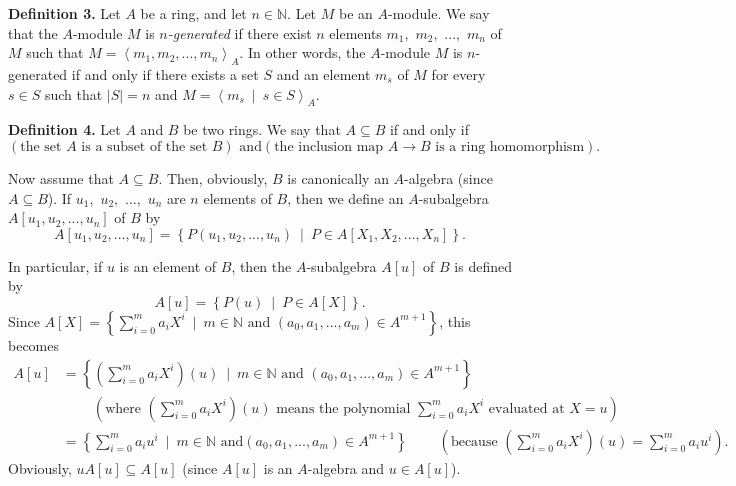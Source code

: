 \documentclass[12pt,final,notitlepage,onecolumn]{article}%
\begin{document}
\textbf{Definition 3.} Let $A$ be a ring, and let $n\in\mathbb{N}$. Let $M$ be
an $A$-module. We say that the $A$-module $M$ is $n$\textit{-generated} if
there exist $n$ elements $m_{1},$ $m_{2},$ $...,$ $m_{n}$ of $M$ such that
$M=\left\langle m_{1},m_{2},...,m_{n}\right\rangle _{A}$. In other words, the
$A$-module $M$ is $n$-generated if and only if there exists a set $S$ and an
element $m_{s}$ of $M$ for every $s\in S$ such that $\left\vert S\right\vert
=n$ and $M=\left\langle m_{s}\ \mid\ s\in S\right\rangle _{A}$.

\textbf{Definition 4.} Let $A$ and $B$ be two rings. We say that $A\subseteq
B$ if and only if
\[
\left(  \text{the set }A\text{ is a subset of the set }B\right)  \text{ and
}\left(  \text{the inclusion map }A\rightarrow B\text{ is a ring
homomorphism}\right)  .
\]


Now assume that $A\subseteq B$. Then, obviously, $B$ is canonically an
$A$-algebra (since $A\subseteq B$). If $u_{1},$ $u_{2},$ $...,$ $u_{n}$ are
$n$ elements of $B$, then we define an $A$-subalgebra $A\left[  u_{1}%
,u_{2},...,u_{n}\right]  $ of $B$ by%
\[
A\left[  u_{1},u_{2},...,u_{n}\right]  =\left\{  P\left(  u_{1},u_{2}%
,...,u_{n}\right)  \ \mid\ P\in A\left[  X_{1},X_{2},...,X_{n}\right]
\right\}  .
\]


In particular, if $u$ is an element of $B$, then the $A$-subalgebra $A\left[
u\right]  $ of $B$ is defined by%
\[
A\left[  u\right]  =\left\{  P\left(  u\right)  \ \mid\ P\in A\left[
X\right]  \right\}  .
\]
Since $A\left[  X\right]  =\left\{  \sum\limits_{i=0}^{m}a_{i}X^{i}%
\ \mid\ m\in\mathbb{N}\text{ and }\left(  a_{0},a_{1},...,a_{m}\right)  \in
A^{m+1}\right\}  $, this becomes
\begin{align*}
A\left[  u\right]   &  =\left\{  \left(  \sum\limits_{i=0}^{m}a_{i}%
X^{i}\right)  \left(  u\right)  \ \mid\ m\in\mathbb{N}\text{ and }\left(
a_{0},a_{1},...,a_{m}\right)  \in A^{m+1}\right\} \\
&  \ \ \ \ \ \ \ \ \ \ \left(  \text{where }\left(  \sum\limits_{i=0}^{m}%
a_{i}X^{i}\right)  \left(  u\right)  \text{ means the polynomial }%
\sum\limits_{i=0}^{m}a_{i}X^{i}\text{ evaluated at }X=u\right) \\
&  =\left\{  \sum\limits_{i=0}^{m}a_{i}u^{i}\ \mid\ m\in\mathbb{N}\text{ and
}\left(  a_{0},a_{1},...,a_{m}\right)  \in A^{m+1}\right\}
\ \ \ \ \ \ \ \ \ \ \left(  \text{because }\left(  \sum\limits_{i=0}^{m}%
a_{i}X^{i}\right)  \left(  u\right)  =\sum\limits_{i=0}^{m}a_{i}u^{i}\right)
.
\end{align*}
Obviously, $uA\left[  u\right]  \subseteq A\left[  u\right]  $ (since
$A\left[  u\right]  $ is an $A$-algebra and $u\in A\left[  u\right]  $).
\end{document}
